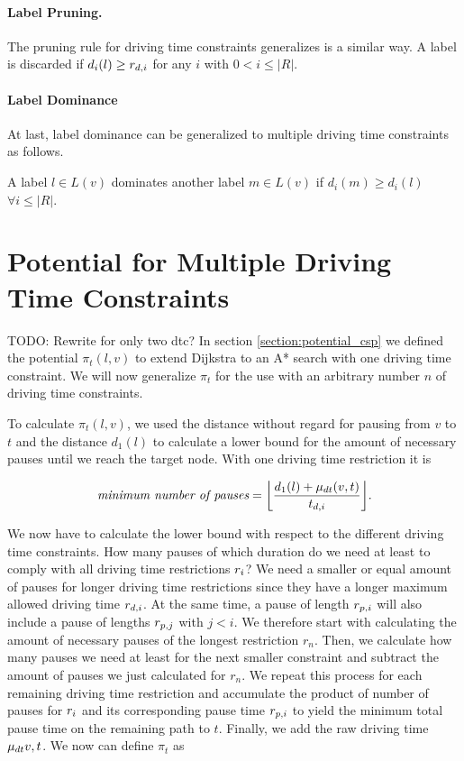 \paragraph{Label Pruning.}
The pruning rule for driving time constraints generalizes is a similar way. A label is discarded if $d_i(l) \ge r_{d,i}$ for any $i$ with $0 < i \le |R|$.


\paragraph{Label Dominance}
At last, label dominance can be generalized to multiple driving time constraints as follows.
\begin{definition}
	A label $l \in L(v)$ dominates another label $m \in L(v)$ if $d_i(m) \ge d_i(l)$ $\forall i \le |R|$.
\end{definition}

\section{Potential for Multiple Driving Time Constraints}
TODO: Rewrite for only two dtc?
In section \ref{section:potential_csp} we defined the potential $\pi_t(l,v)$ to extend Dijkstra to an A* search with one driving time constraint. We will now generalize $\pi_t$ for the use with an arbitrary number $n$ of driving time constraints.

To calculate $\pi_t(l,v)$, we used the distance without regard for pausing from $v$ to $t$ and the distance $d_1(l)$ to calculate a lower bound for the amount of necessary pauses until we reach the target node. With one driving time restriction it is

\[\textit{minimum number of pauses} = \floor*{ \frac{d_{1}(l) + \drivingtime(v,t)}{t_{d,i}} }.\]

We now have to calculate the lower bound with respect to the different driving time constraints. How many pauses of which duration do we need at least to comply with all driving time restrictions $r_i$? We need a smaller or equal amount of pauses for longer driving time restrictions since they have a longer maximum allowed driving time $r_{d,i}$. At the same time, a pause of length $r_{p,i}$ will also include a pause of lengths $r_{p,j}$ with $j < i$. We therefore start with calculating the amount of necessary pauses of the longest restriction $r_n$. Then, we calculate how many pauses we need at least for the next smaller constraint and subtract the amount of pauses we just calculated for $r_n$. We repeat this process for each remaining driving time restriction and accumulate the product of number of pauses for $r_i$ and its corresponding pause time $r_{p,i}$ to yield the minimum total pause time on the remaining path to $t$. Finally, we add the raw driving time $\mu_{dt}{v,t}$. We now can define $\pi_t$ as


